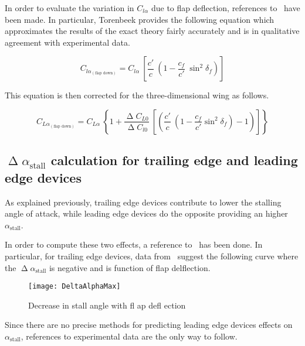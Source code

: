 \noindent
In order to evaluate the variation in $C_{l\alpha}$ due to flap deflection, references to~\cite{torenbeek1982synthesis} have been made. In particular, Torenbeek provides the following equation which approximates the results of the exact theory fairly accurately and is in qualitative agreement with experimental data. 

\begin{equation}
C_{l\alpha_{\left(\text{flap down}\right)}}=C_{l\alpha}\ \left[\dfrac{c'}{c}\ \left(1-\dfrac{c_f}{c'}\ \sin^2\delta_f\right)\right]
\label{eqn:ClalphaFlap}
\end{equation}

\noindent
This equation is then corrected for the three-dimensional wing as follows.

\begin{equation}
C_{L\alpha_{\left(\text{flap down}\right)}}=C_{L\alpha}\ \left\{1+\dfrac{\upDelta C_{L0}}{\upDelta C_{l0}}\ \left[\left(\dfrac{c'}{c}\ \left(1-\dfrac{c_f}{c'}\sin^2\delta_f\right)-1\right)\right]\right\}
\label{eqn:ClalphaFlap}
\end{equation}

\subsection{$\upDelta\alpha_{\text{stall}}$ calculation for trailing edge and leading edge devices}
As explained previously, trailing edge devices contribute to lower the stalling angle of attack, while leading edge devices do the opposite providing an higher $\alpha_{\text{stall}}$. 

In order to compute these two effects, a reference to~\cite{nicolai2010fundamentals} has been done. In particular, for trailing edge devices, data from~\cite{abbott} suggest the following curve where the $\upDelta\alpha_{\text{stall}}$ is negative and is function of flap delflection.

\begin{figure}[H]
  \centering
  \texttt{[image: DeltaAlphaMax]}
  \caption{Decrease in stall angle with fl ap defl ection}
  \label{fig:DeltaAlphaMaxFlap}
\end{figure}

\noindent
Since there are no precise methods for predicting leading edge devices effects on $\alpha_{\text{stall}}$, references to experimental data are the only way to follow. 

